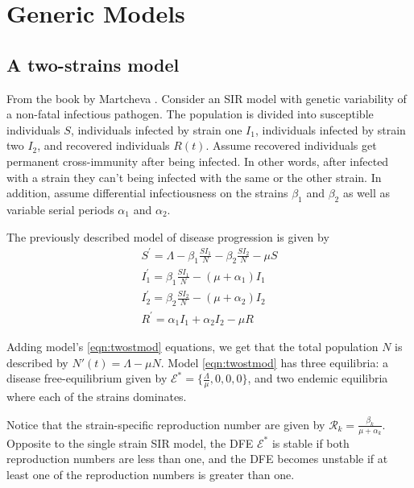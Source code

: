 \documentclass{book}
\begin{document}
\chapter{Generic Models}
\label{chapt:genmods}

\section{A two-strains model}

From the book by Martcheva \cite{martcheva2015introduction}. Consider an SIR model with  genetic variability of a non-fatal infectious pathogen. The population is divided into susceptible individuals $S$, individuals infected by strain one $I_{1}$, individuals infected by strain two $I_{2}$, and recovered individuals $R(t)$. Assume recovered individuals get permanent cross-immunity after being infected. In other words, after infected with a strain they can't being infected with the same or the other strain.
%
In addition, assume differential infectiousness on the strains $\beta_1$ and $\beta_2$ as well as variable serial periods $\alpha_1$ and $\alpha_2$.

The previously described model of disease progression is given by 
\begin{equation} \label{eqn:twostmod}
\begin{array}{l}
S^{\prime}=\Lambda-\beta_{1} \frac{S I_{1}}{N}-\beta_{2} \frac{S I_{2}}{N}-\mu S \\
I_{1}^{\prime}=\beta_{1} \frac{S I_{1}}{N}-\left(\mu+\alpha_{1}\right) I_{1} \\
I_{2}^{\prime}=\beta_{2} \frac{S I_{2}}{N}-\left(\mu+\alpha_{2}\right) I_{2} \\
R^{\prime}=\alpha_{1} I_{1}+\alpha_{2} I_{2}-\mu R
\end{array}
\end{equation}

Adding model's \ref{eqn:twostmod} equations, we get that the total population $N$ is described by $N'(t)=\Lambda-\mu N$.
%
Model \ref{eqn:twostmod} has three equilibria: a disease free-equilibrium given by $\mathcal{E}^*=\{\frac{\Lambda}{\mu},0,0,0\}$, and two endemic equilibria where each of the strains dominates.

Notice that the strain-specific reproduction number are given by $\mathcal{R}_k=\frac{\beta_k}{\mu+\alpha_k}$. Opposite to the single strain SIR model, the DFE $\mathcal{E}^*$ is stable if both reproduction numbers are less than one, and the DFE becomes unstable if at least one of the reproduction numbers is greater than one.
\end{document}
